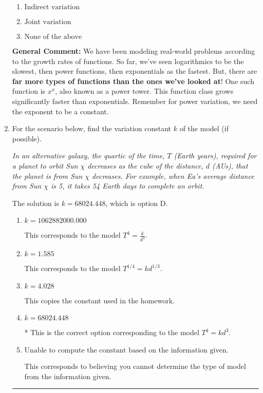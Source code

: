 \documentclass{extbook}[14pt]
\newcommand{\litem}[1]{\item #1

\rule{\textwidth}{0.4pt}}
\begin{document}
\begin{enumerate}
{\begin{enumerate}[label=\Alph*.]
\item \( \text{Indirect variation} \)


\item \( \text{Joint variation} \)


\item \( \text{None of the above} \)


\end{enumerate}

\textbf{General Comment:} We have been modeling real-world problems according to the growth rates of functions. So far, we've seen logarithmics to be the slowest, then power functions, then exponentials as the fastest. But, there are \textbf{far more types of functions than the ones we've looked at}! One such function is $x^x$, also known as a power tower. This function class grows significantly faster than exponentials. Remember for power variation, we need the exponent to be a constant.
}
\litem{
For the scenario below, find the variation constant $k$ of the model (if possible).

\begin{center}
    \textit{ In an alternative galaxy, the quartic of the time, $T$ (Earth years), required for a planet to orbit Sun $\chi$ decreases as the cube of the distance, $d$ (AUs), that the planet is from Sun $\chi$ decreases. For example, when Ea's average distance from Sun $\chi$ is 5, it takes 54 Earth days to complete an orbit. }
\end{center}
The solution is \( k = 68024.448 \), which is option D.\begin{enumerate}[label=\Alph*.]
\item \( k = 1062882000.000 \)

This corresponds to the model $T^{4} = \frac{k}{d^{3}}$.
\item \( k = 1.585 \)

This corresponds to the model $T^{1/4} = k d^{1/3}$.
\item \( k = 4.028 \)

This copies the constant used in the homework.
\item \( k = 68024.448 \)

* This is the correct option corresponding to the model $T^{4} = k d^{3}$.
\item \( \text{Unable to compute the constant based on the information given.} \)

This corresponds to believing you cannot determine the type of model from the information given.
\end{enumerate}

}
\end{enumerate}
\end{document}
